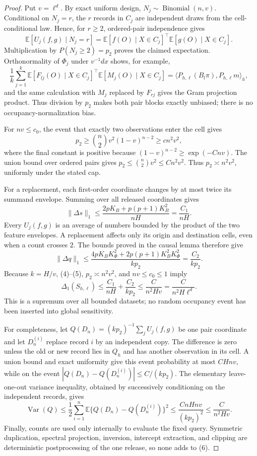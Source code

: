 \documentclass{article}
\begin{document}
\begin{proof}
Put \(v=\ell^d\).  By exact uniform design, \(N_j\sim\operatorname{Binomial}(n,v)\).  Conditional on \(N_j=r\), the \(r\) records in \(C_j\) are independent draws from the cell-conditional law.  Hence, for \(r\ge2\), ordered-pair independence gives
\[
 \mathbb E[U_j(f,g)\mid N_j=r]
 =\mathbb E[f(O)\mid X\in C_j]^\top
  \mathbb E[g(O)\mid X\in C_j].
\]
Multiplication by \(P(N_j\ge2)=p_2\) proves the claimed expectation.  Orthonormality of \(\Phi_j\) under \(v^{-1}dx\) shows, for example,
\[
 \frac1k\sum_{j=1}^k
 \mathbb E[F_{lj}(O)\mid X\in C_j]^\top
 \mathbb E[M_j(O)\mid X\in C_j]
 =\langle P_{h,\ell}(B_l\pi),P_{h,\ell}m\rangle_h,
\]
and the same calculation with \(M_j\) replaced by \(F_{rj}\) gives the Gram projection product.  Thus division by \(p_2\) makes both pair blocks exactly unbiased; there is no occupancy-normalization bias.

For \(nv\le c_0\), the event that exactly two observations enter the cell gives
\[
 p_2\ge {n\choose2}v^2(1-v)^{n-2}\ge c n^2v^2,
\]
where the final constant is positive because \((1-v)^{n-2}\ge\exp(-Cnv)\).  The union bound over ordered pairs gives \(p_2\le {n\choose2}v^2\le Cn^2v^2\).  Thus \(p_2\asymp n^2v^2\), uniformly under the stated cap.

For a replacement, each first-order coordinate changes by at most twice its summand envelope.  Summing over all released coordinates gives
\[
 \|\Delta s\|_1\le
 \frac{2pK_B+p(p+1)K_B^2}{nH}=\frac{C_1}{nH}.             \tag{4}
\]
Every \(U_j(f,g)\) is an average of numbers bounded by the product of the two feature envelopes.  A replacement affects only its origin and destination cells, even when a count crosses \(2\).  The bounds proved in the causal lemma therefore give
\[
 \|\Delta q\|_1\le
 \frac{4pK_BK_\Phi^2+2p(p+1)K_B^2K_\Phi^2}{kp_2}
 =\frac{C_2}{kp_2}.                                      \tag{5}
\]
Because \(k=H/v\), (4)--(5), \(p_2\asymp n^2v^2\), and \(nv\le c_0\le1\) imply
\[
 \Delta_1(S_{h,\ell})
 \le \frac{C_1}{nH}+\frac{C_2}{kp_2}
 \le \frac{C}{n^2Hv}
 =\frac{C}{n^2H\ell^d}.                                 \tag{6}
\]
This is a supremum over all bounded datasets; no random occupancy event has been inserted into global sensitivity.

For completeness, let \(Q(D_n)=(kp_2)^{-1}\sum_jU_j(f,g)\) be one pair coordinate and let \(D_n^{(i)}\) replace record \(i\) by an independent copy.  The difference is zero unless the old or new record lies in \(Q_h\) and has another observation in its cell.  A union bound and exact uniformity give this event probability at most \(CHnv\), while on the event \(|Q(D_n)-Q(D_n^{(i)})|\le C/(kp_2)\).  The elementary leave-one-out variance inequality, obtained by successively conditioning on the independent records, gives
\[
 \operatorname{Var}(Q)\le\frac12\sum_{i=1}^n
 \mathbb E\{Q(D_n)-Q(D_n^{(i)})\}^2
 \le \frac{CnHnv}{(kp_2)^2}
 \le \frac{C}{n^2Hv}.                                   \tag{7}
\]
Finally, counts are used only internally to evaluate the fixed query.  Symmetric duplication, spectral projection, inversion, intercept extraction, and clipping are deterministic postprocessing of the one release, so none adds to (6).
\end{proof}
\end{document}
